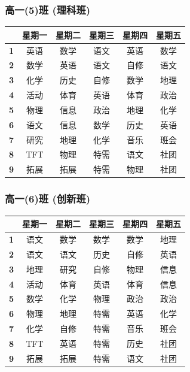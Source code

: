 \documentclass[a4paper]{article}
\begin{document}
  \subsubsection{高一(5)班 (理科班)}
   \begin{tabular}{|c|c|c|c|c|c|}
   \hline
   & \bf 星期一 & \bf 星期二 & \bf 星期三 & \bf 星期四 & \bf 星期五 \\\hline
   \bf 1 & 英语 & 数学 & 语文 & 英语 & 数学 \\\hline
   \bf 2 & 数学 & 英语 & 语文 & 自修 & 语文 \\\hline
   \bf 3 & 化学 & 历史 & 自修 & 数学 & 地理 \\\hline
   \bf 4 & 活动 & 体育 & 英语 & 体育 & 政治 \\\hline
   \bf 5 & 物理 & 信息 & 政治 & 地理 & 化学 \\\hline
   \bf 6 & 语文 & 信息 & 数学 & 历史 & 英语 \\\hline
   \bf 7 & 研究 & 地理 & 化学 & 音乐 & 班会 \\\hline
   \bf 8 & TFT  & 物理 & 特需 & 语文 & 社团 \\\hline
   \bf 9 & 拓展 & 拓展 & 特需 & 物理 & 社团 \\\hline
   \end{tabular}
  \subsubsection{高一(6)班 (创新班)}
   \begin{tabular}{|c|c|c|c|c|c|}
   \hline
   & \bf 星期一 & \bf 星期二 & \bf 星期三 & \bf 星期四 & \bf 星期五 \\\hline
   \bf 1 & 语文 & 数学 & 数学 & 数学 & 地理 \\\hline
   \bf 2 & 语文 & 语文 & 历史 & 自修 & 英语 \\\hline
   \bf 3 & 地理 & 研究 & 自修 & 物理 & 信息 \\\hline
   \bf 4 & 活动 & 体育 & 英语 & 体育 & 信息 \\\hline
   \bf 5 & 数学 & 化学 & 物理 & 政治 & 政治 \\\hline
   \bf 6 & 物理 & 地理 & 特需 & 英语 & 化学 \\\hline
   \bf 7 & 化学 & 自修 & 特需 & 音乐 & 班会 \\\hline
   \bf 8 & TFT  & 英语 & 特需 & 历史 & 社团 \\\hline
   \bf 9 & 拓展 & 拓展 & 特需 & 语文 & 社团 \\\hline
   \end{tabular}
 \clearpage
\end{document}
